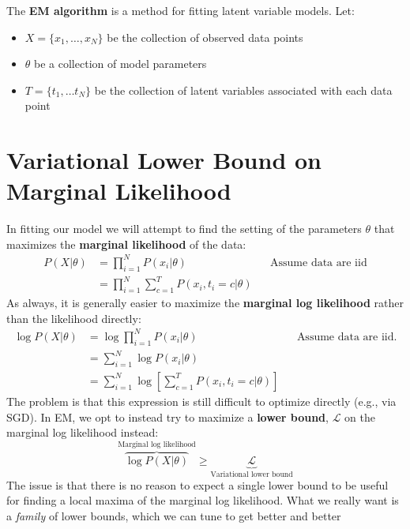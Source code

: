 \documentclass[11pt]{article}
\newenvironment{pitemize}{
    \vspace{-3mm}
    \begin{itemize}
        \setlength{\itemsep}{1pt}
        \setlength{\parskip}{0pt}
        \setlength{\parsep}{0pt}
}{\end{itemize}}
\begin{document}
The \textbf{EM algorithm} is a method for fitting latent variable models. Let:
\begin{pitemize}
    \item $X = \{ x_1, \ldots, x_N \}$ be the collection of observed data points
    \item $\theta$ be a collection of model parameters
    \item $T = \{t_1, \ldots t_N \}$ be the collection of latent variables
        associated with each data point
\end{pitemize}

\section*{Variational Lower Bound on Marginal Likelihood}
In fitting our model we will attempt to find the setting of the parameters
$\theta$ that maximizes the \textbf{marginal likelihood} of the data:
\begin{align*}
    P(X|\theta) &= \prod_{i=1}^N P(x_i | \theta) &&\text{Assume data are iid}\\
    &= \prod_{i=1}^N \sum_{c=1}^T P(x_i, t_i = c | \theta)
\end{align*}
As always, it is generally easier to maximize the \textbf{marginal log
likelihood} rather than the likelihood directly:
\begin{align*}
    \log P(X|\theta) &= \log \prod_{i=1}^N P(x_i | \theta) &&\text{Assume data
    are iid.}\\
    &= \sum_{i=1}^N \log P(x_i | \theta)\\
    &= \sum_{i=1}^N \log \left[ \sum_{c=1}^T P(x_i, t_i = c | \theta )\right]
\end{align*}
The problem is that this expression is still difficult to optimize directly
(e.g., via SGD). In EM, we opt to instead try to maximize a \textbf{lower
bound}, $\mathcal{L}$ on the marginal log likelihood instead:
\begin{equation*}
    \overbrace{\log P(X|\theta)}^{\text{Marginal log likelihood}} \geq \underbrace{\mathcal{L}}_{\text{Variational lower
    bound}}
\end{equation*}
The issue is that there is no reason to expect a single lower bound to be useful
for finding a local maxima of the marginal log likelihood. What we really want
is a  \emph{family} of lower bounds, which we can tune to get better and better 
\end{document}
